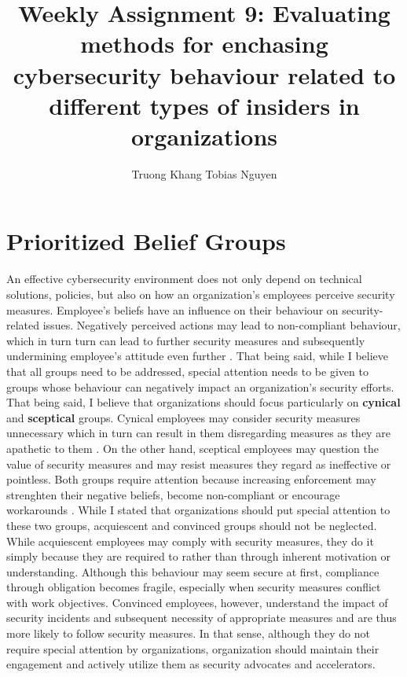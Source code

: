 \documentclass[12pt]{article}
\title{Weekly Assignment 9: Evaluating methods for enchasing cybersecurity behaviour related to different types of insiders in organizations}
\author{Truong Khang Tobias Nguyen}
\date{}
\begin{document}
\maketitle

\section{Prioritized Belief Groups}
An effective cybersecurity environment does not only depend on technical solutions, policies, but also on how an organization's employees perceive security measures. Employee's beliefs have an influence on their behaviour on security-related issues. Negatively perceived actions may lead to non-compliant behaviour, which in turn turn can lead to further security measures and subsequently undermining employee's attitude even further \cite{balozian2023adversarial}.
\newline
That being said, while I believe that all groups need to be addressed, special attention needs to be given to groups whose behaviour can negatively impact an organization's security efforts. That being said, I believe that organizations should focus particularly on \textbf{cynical} and \textbf{sceptical} groups. 
\newline
Cynical employees may consider security measures unnecessary which in turn can result in them disregarding measures as they are apathetic to them \cite{malik2026security}. On the other hand, sceptical employees may question the value of security measures and may resist measures they regard as ineffective or pointless. Both groups require attention because increasing enforcement may strenghten their negative beliefs, become non-compliant or encourage workarounds \cite{balozian2023adversarial}.
\newline
While I stated that organizations should put special attention to these two groups, acquiescent and convinced groups should not be neglected. While acquiescent employees may comply with security measures, they do it simply because they are required to rather than through inherent motivation or understanding. Although this behaviour may seem secure at first, compliance through obligation becomes fragile, especially when security measures conflict with work objectives.
\newline
Convinced employees, however, understand the impact of security incidents and subsequent necessity of appropriate measures and are thus more likely to follow security measures. In that sense, although they do not require special attention by organizations, organization should maintain their engagement and actively utilize them as security advocates and accelerators.
\end{document}
